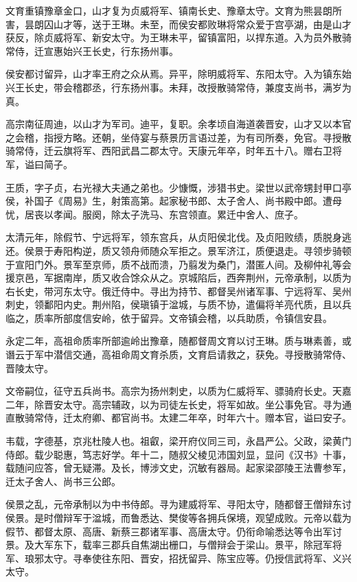 \documentclass[]{article}
\begin{document}
文育重镇豫章金口，山才复为贞威将军、镇南长史、豫章太守。文育为熊昙朗所害，昙朗囚山才等，送于王琳。未至，而侯安都败琳将常众爱于宫亭湖，由是山才获反，除贞威将军、新安太守。为王琳未平，留镇富阳，以捍东道。入为员外散骑常侍，迁宣惠始兴王长史，行东扬州事。

侯安都讨留异，山才率王府之众从焉。异平，除明威将军、东阳太守。入为镇东始兴王长史，带会稽郡丞，行东扬州事。未拜，改授散骑常侍，兼度支尚书，满岁为真。

高宗南征周迪，以山才为军司。迪平，复职。余孝顷自海道袭晋安，山才又以本官之会稽，指授方略。还朝，坐侍宴与蔡景历言语过差，为有司所奏，免官。寻授散骑常侍，迁云旗将军、西阳武昌二郡太守。天康元年卒，时年五十八。赠右卫将军，谥曰简子。

王质，字子贞，右光禄大夫通之弟也。少慷慨，涉猎书史。梁世以武帝甥封甲口亭侯，补国子《周易》生，射策高第。起家秘书郎、太子舍人、尚书殿中郎。遭母忧，居丧以孝闻。服阕，除太子洗马、东宫领直。累迁中舍人、庶子。

太清元年，除假节、宁远将军，领东宫兵，从贞阳侯北伐。及贞阳败绩，质脱身逃还。侯景于寿阳构逆，质又领舟师随众军拒之。景军济江，质便退走。寻领步骑顿于宣阳门外。景军至京师，质不战而溃，乃翦发为桑门，潜匿人间。及柳仲礼等会援京邑，军据南岸，质又收合馀众从之。京城陷后，西奔荆州，元帝承制，以质为右长史，带河东太守。俄迁侍中。寻出为持节、都督吴州诸军事、宁远将军、吴州刺史，领鄱阳内史。荆州陷，侯瑱镇于湓城，与质不协，遣偏将羊亮代质，且以兵临之，质率所部度信安岭，依于留异。文帝镇会稽，以兵助质，令镇信安县。

永定二年，高祖命质率所部逾岭出豫章，随都督周文育以讨王琳。质与琳素善，或谮云于军中潜信交通，高祖命周文育杀质，文育启请救之，获免。寻授散骑常侍、晋陵太守。

文帝嗣位，征守五兵尚书。高宗为扬州刺史，以质为仁威将军、骠骑府长史。天嘉二年，除晋安太守。高宗辅政，以为司徒左长史，将军如故。坐公事免官。寻为通直散骑常侍，迁太府卿、都官尚书。太建二年卒，时年六十。赠本官，谥曰安子。

韦载，字德基，京兆杜陵人也。祖叡，梁开府仪同三司，永昌严公。父政，梁黄门侍郎。载少聪惠，笃志好学。年十二，随叔父棱见沛国刘显，显问《汉书》十事，载随问应答，曾无疑滞。及长，博涉文史，沉敏有器局。起家梁邵陵王法曹参军，迁太子舍人、尚书三公郎。

侯景之乱，元帝承制以为中书侍郎。寻为建威将军、寻阳太守，随都督王僧辩东讨侯景。是时僧辩军于湓城，而鲁悉达、樊俊等各拥兵保境，观望成败。元帝以载为假节、都督太原、高唐、新蔡三郡诸军事、高唐太守。仍衔命喻悉达等令出军讨景。及大军东下，载率三郡兵自焦湖出栅口，与僧辩会于梁山。景平，除冠军将军、琅邪太守。寻奉使往东阳、晋安，招抚留异、陈宝应等。仍授信武将军、义兴太守。
\end{document}
